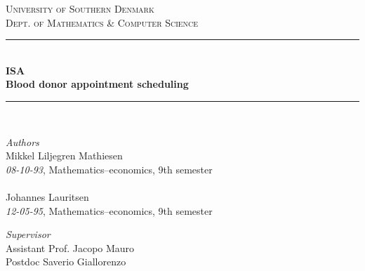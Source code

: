 \documentclass[a4paper,12pt]{article}
\begin{document}
	\begin{titlepage} %
		\newcommand{\HRule}{\rule{\linewidth}{0.5mm}} %
		
		\center %
		
		
		\textsc{\LARGE University of Southern Denmark}\\[0.5cm] %
		
		\textsc{\Large Dept. of Mathematics \& Computer Science
         }\\[0.5cm] %
		
		
		\HRule\\[0.2cm]
		
		{\huge\bfseries ISA \\ [0.4cm] Blood donor appointment scheduling
		}\\[0.4cm] %
		
		\HRule\\[2 cm]
		
		
	
		\begin{flushleft}
			\large
			\textit{Authors}\\
			Mikkel Liljegren Mathiesen\\
			\textit{08-10-93}, Mathematics–economics, 9th semester\\
			\ \\
			Johannes Lauritsen\\
			\textit{12-05-95}, Mathematics–economics, 9th semester
		\end{flushleft}
		
		\begin{flushleft}
			\large
			\textit{Supervisor}\\
			Assistant Prof. Jacopo Mauro\\
			Postdoc Saverio Giallorenzo
			

		\end{flushleft}


\end{titlepage}
\end{document}
